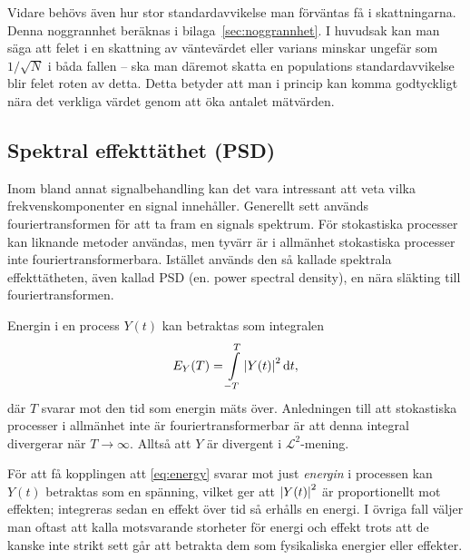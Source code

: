 Vidare behövs även hur stor standardavvikelse man förväntas få i skattningarna. Denna noggrannhet beräknas i bilaga~\ref{sec:noggrannhet}. I huvudsak kan man säga att felet i en skattning av väntevärdet eller varians\footnotemark{} minskar ungefär som $1/\sqrt{N}$ i båda fallen -- ska man däremot skatta en populations standardavvikelse blir felet roten av detta. 
Detta betyder att man i princip kan komma godtyckligt nära det verkliga värdet genom att öka antalet mätvärden.



\subsection{Spektral effekttäthet (PSD)} \label{sec:PSD}

Inom bland annat signalbehandling kan det vara intressant att veta vilka frekvenskomponenter en signal innehåller. Generellt sett används fouriertransformen för att ta fram en signals spektrum.
För stokastiska processer kan liknande metoder användas, men tyvärr är i allmänhet stokastiska processer inte fouriertransformerbara. Istället används den så kallade spektrala effekttätheten, även kallad PSD (en. power spectral density), en nära släkting till fouriertransformen.

Energin i en process $Y(t)$ kan betraktas som integralen
\begin{equation}\label{eq:energy}
E_Y(T) = \int_{-T}^{T} \abs{Y(t)}^2\id{t},
\end{equation}
där $T$ svarar mot den tid som energin mäts över. Anledningen till att stokastiska processer i allmänhet inte är fouriertransformerbar är att denna integral divergerar när $T\to\infty$. Alltså att $Y$ är divergent i $\mathcal{L}^2$-mening. 

För att få kopplingen att \eqref{eq:energy} svarar mot just \emph{energin} i processen kan $Y(t)$ betraktas som en spänning, vilket ger att $\abs{Y(t)}^2$ är proportionellt mot effekten; integreras sedan en effekt över tid så erhålls en energi. I övriga fall väljer man oftast att kalla motsvarande storheter för energi och effekt trots att de kanske inte strikt sett går att betrakta dem som fysikaliska energier eller effekter. 

